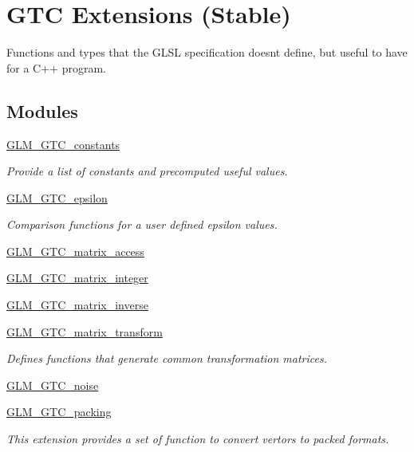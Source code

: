 \hypertarget{group__gtc}{}\section{G\+TC Extensions (Stable)}
\label{group__gtc}


Functions and types that the G\+L\+SL specification doesn\textquotesingle{}t define, but useful to have for a C++ program.  


\subsection*{Modules}
\begin{DoxyCompactItemize}
\item 
\hyperlink{group__gtc__constants}{G\+L\+M\+\_\+\+G\+T\+C\+\_\+constants}
\begin{DoxyCompactList}\small\item\em Provide a list of constants and precomputed useful values. \end{DoxyCompactList}\item 
\hyperlink{group__gtc__epsilon}{G\+L\+M\+\_\+\+G\+T\+C\+\_\+epsilon}
\begin{DoxyCompactList}\small\item\em Comparison functions for a user defined epsilon values. \end{DoxyCompactList}\item 
\hyperlink{group__gtc__matrix__access}{G\+L\+M\+\_\+\+G\+T\+C\+\_\+matrix\+\_\+access}
\item 
\hyperlink{group__gtc__matrix__integer}{G\+L\+M\+\_\+\+G\+T\+C\+\_\+matrix\+\_\+integer}
\item 
\hyperlink{group__gtc__matrix__inverse}{G\+L\+M\+\_\+\+G\+T\+C\+\_\+matrix\+\_\+inverse}
\item 
\hyperlink{group__gtc__matrix__transform}{G\+L\+M\+\_\+\+G\+T\+C\+\_\+matrix\+\_\+transform}
\begin{DoxyCompactList}\small\item\em Defines functions that generate common transformation matrices. \end{DoxyCompactList}\item 
\hyperlink{group__gtc__noise}{G\+L\+M\+\_\+\+G\+T\+C\+\_\+noise}
\item 
\hyperlink{group__gtc__packing}{G\+L\+M\+\_\+\+G\+T\+C\+\_\+packing}
\begin{DoxyCompactList}\small\item\em This extension provides a set of function to convert vertors to packed formats. \end{DoxyCompactList}\item 

\end{DoxyCompactItemize}
